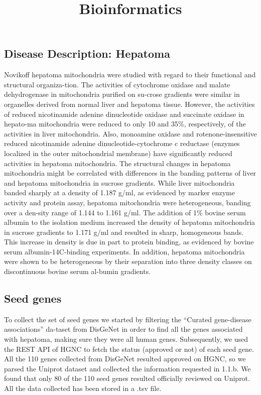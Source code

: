 \documentclass[
]{article}
\title{Bioinformatics}
\author{}
\date{\vspace{-2.5em}}
\begin{document}
\maketitle

\hypertarget{disease-description-hepatoma}{%
\subsection{Disease Description:
Hepatoma}\label{disease-description-hepatoma}}

Novikoff hepatoma mitochondria were studied with regard to their
functional and structural organiza-tion. The activities of cytochrome
oxidase and malate dehydrogenase in mitochondria purified on su-crose
gradients were similar in organelles derived from normal liver and
hepatoma tissue. However, the activities of reduced nicotinamide adenine
dinucleotide oxidase and succinate oxidase in hepato-ma mitochondria
were reduced to only 10 and 35\%, respectively, of the activities in
liver mitochondria. Also, monoamine oxidase and rotenone-insensitive
reduced nicotinamide adenine dinucleotide-cytochrome c reductase
(enzymes localized in the outer mitochondrial membrane) have
significantly reduced activities in hepatoma mitochondria. The
structural changes in hepatoma mitochondria might be correlated with
differences in the banding patterns of liver and hepatoma mitochondria
in sucrose gradients. While liver mitochondria banded sharply at a
density of 1.187 g/ml, as evidenced by marker enzyme activity and
protein assay, hepatoma mitochondria were heterogeneous, banding over a
den-sity range of 1.144 to 1.161 g/ml. The addition of 1\% bovine serum
albumin to the isolation medium increased the density of hepatoma
mitochondria in sucrose gradients to 1.171 g/ml and resulted in sharp,
homogeneous bands. This increase in density is due in part to protein
binding, as evidenced by bovine serum albumin-14C-binding experiments.
In addition, hepatoma mitochondria were shown to be heterogeneous by
their separation into three density classes on discontinuous bovine
serum al-bumin gradients.

\hypertarget{seed-genes}{%
\subsection{Seed genes}\label{seed-genes}}

To collect the set of seed genes we started by filtering the ``Curated
gene-disease associations'' da-taset from DisGeNet in order to find all
the genes associated with hepatoma, making sure they were all human
genes. Subsequently, we used the REST API of HGNC to fetch the status
(approved or not) of each seed gene. All the 110 genes collected from
DisGeNet resulted approved on HGNC, so we parsed the Uniprot dataset and
collected the information requested in 1.1.b. We found that only 80 of
the 110 seed genes resulted officially reviewed on Uniprot. All the data
collected has been stored in a .tsv file.
\end{document}
